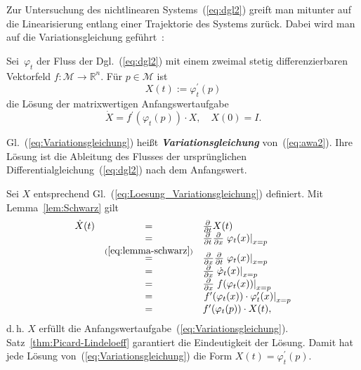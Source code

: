 Zur Untersuchung des nichtlinearen Systems~(\ref{eq:dgl2}) greift
man mitunter auf die Linearisierung entlang einer Trajektorie des
Systems zurück. Dabei wird man auf die Variationsgleichung geführt~\cite[Kap.~{32}]{arnold2001}:
\begin{proposition}
[Variationsgleichung]\label{pro:Variationsgleichung}Sei~$\varphi_{t}$
der Fluss der Dgl.~(\ref{eq:dgl2}) mit einem zweimal stetig differenzierbaren
Vektorfeld $f:\mathcal{M}\to{\mathbb{R}}^{n}$. Für $p\in\mathcal{M}$ ist
\begin{equation}
X(t):=\varphi_{t}^{\prime}(p)\label{eq:Loesung_Variationsgleichung}
\end{equation}
 die Lösung der matrixwertigen Anfangswertaufgabe
\begin{equation}
\dot{X}=f^{\prime}(\varphi_{t}(p))\cdot X,\quad X(0)=I.\label{eq:Variationsgleichung}
\end{equation}
\end{proposition}
Gl.~(\ref{eq:Variationsgleichung}) heißt \textbf{\em Variationsgleichung}
von~(\ref{eq:awa2}). Ihre Lösung ist die Ableitung des Flusses der
ursprünglichen Differentialgleichung~(\ref{eq:dgl2}) nach dem Anfangswert.
\begin{svmultproof}
Sei $X$ entsprechend Gl.~(\ref{eq:Loesung_Variationsgleichung})
definiert. Mit Lemma~\ref{lem:Schwarz} gilt
\[
\begin{array}{ccl}
\dot{X}(t) & = & \frac{\partial}{\partial t}X(t)\\
 & = & \frac{\partial}{\partial t}\frac{\partial}{\partial x}\left.\varphi_{t}(x)\right|_{x=p}\\
 & \stackrel{(\ref{eq:lemma-schwarz})}{=} & \frac{\partial}{\partial x}\frac{\partial}{\partial t}\left.\varphi_{t}(x)\right|_{x=p}\\
 & = & \frac{\partial}{\partial x}\left.\dot{\varphi}_{t}(x)\right|_{x=p}\\
 & = & \frac{\partial}{\partial x}\left.f(\varphi_{t}(x))\right|_{x=p}\\
 & = & \left.f^{\prime}(\varphi_{t}(x))\cdot\varphi_{t}^{\prime}(x)\right|_{x=p}\\
 & = & f^{\prime}(\varphi_{t}(p))\cdot X(t),
\end{array}
\]
d.\,h. $X$ erfüllt die Anfangswertaufgabe~(\ref{eq:Variationsgleichung}).
Satz~\ref{thm:Picard-Lindeloeff} garantiert die Eindeutigkeit der
Lösung. Damit hat jede Lösung von~(\ref{eq:Variationsgleichung})
die Form $X(t)=\varphi_{t}^{\prime}(p)$.
\end{svmultproof}

